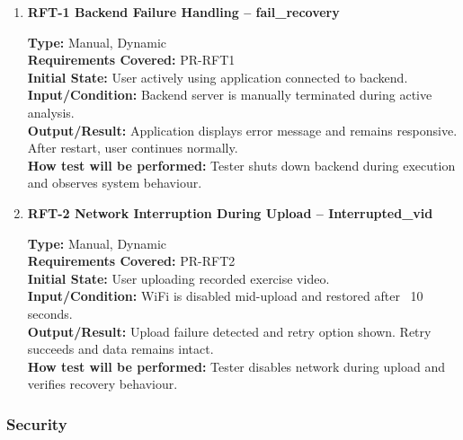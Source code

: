 \documentclass[12pt, titlepage]{article}
\begin{document}
\begin{enumerate}

\item \textbf{RFT-1 Backend Failure Handling -- fail\_recovery}

\textbf{Type:} Manual, Dynamic \\
\textbf{Requirements Covered:} PR-RFT1\\
\textbf{Initial State:} User actively using application connected to backend. \\
\textbf{Input/Condition:} Backend server is manually terminated during active analysis. \\
\textbf{Output/Result:} Application displays error message and remains responsive. After restart, user continues normally. \\
\textbf{How test will be performed:} Tester shuts down backend during execution and observes system behaviour. \\

\vspace{0.5em}

\item \textbf{RFT-2 Network Interruption During Upload -- Interrupted\_vid}

\textbf{Type:} Manual, Dynamic \\
\textbf{Requirements Covered:} PR-RFT2\\
\textbf{Initial State:} User uploading recorded exercise video. \\
\textbf{Input/Condition:} WiFi is disabled mid-upload and restored after ~10 seconds. \\
\textbf{Output/Result:} Upload failure detected and retry option shown. Retry succeeds and data remains intact. \\
\textbf{How test will be performed:} Tester disables network during upload and verifies recovery behaviour. \\

\end{enumerate}

\subsubsection{Security}
\end{document}
